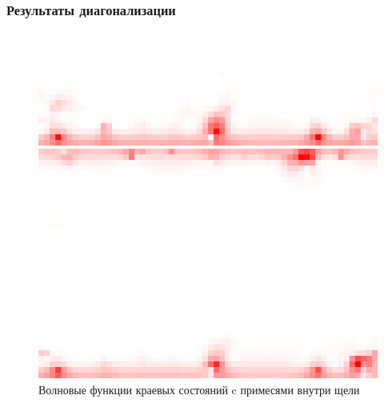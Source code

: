 \documentclass{beamer}
\begin{document}
\begin{frame}
    \frametitle{Результаты диагонализации}
    \begin{figure}[h]
        \centering
        \begin{minipage}[h]{0.9\linewidth}
            \centering
            \includegraphics[width=0.7\linewidth]{fig4.png}
        \end{minipage}
        \vfill
        \begin{minipage}[h]{0.9\linewidth}
            \centering
            \includegraphics[width=0.7\linewidth]{fig5.png}
        \end{minipage}
        \vfill
        \begin{minipage}[h]{0.9\linewidth}
            \centering
            \includegraphics[width=0.7\linewidth]{fig6.png}
        \end{minipage}
        \caption{
            Волновые функции краевых состояний c примесями внутри щели      
        }
    
        \label{fig:magnetic_disorder}
    \end{figure}
\end{frame}
\end{document}
